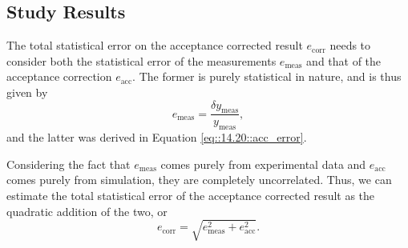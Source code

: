 \subsection{Study Results}
\label{14.30::study_results}


    The total statistical error on the acceptance corrected result $e_\text{corr}$ needs to consider both the statistical error of the measurements $e_\text{meas}$ and that of the acceptance correction $e_\text{acc}$.
    The former is purely statistical in nature, and is thus given by
    \begin{equation*}
        e_\text{meas} = \frac{\delta y_\text{meas}}{y_\text{meas}},
    \end{equation*}
    and the latter was derived in Equation \eqref{eq::14.20::acc_error}.

    Considering the fact that $e_\text{meas}$ comes purely from experimental data and $e_\text{acc}$ comes purely from simulation, they are completely uncorrelated.
    Thus, we can estimate the total statistical error of the acceptance corrected result as the quadratic addition of the two, or
    \begin{equation*}
        e_\text{corr} = \sqrt{e_\text{meas}^2 + e_\text{acc}^2}.
    \end{equation*}





